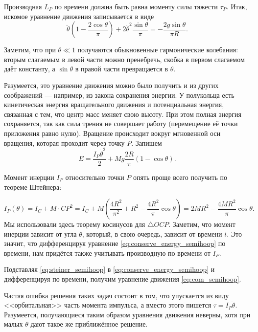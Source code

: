 \documentclass[a4paper,12pt]{article}
\begin{document}
Производная $L_P$ по времени должна быть равна моменту силы тяжести
$\tau_{P}$. Итак, искомое уравнение движения записывается в виде
\begin{equation}
  \label{eq:eom_semihoop}
  \ddot{\theta} \left( 1- \frac{2 \cos \theta}{\pi} \right) + 2
  \dot{\theta}^2 \frac{\sin \theta}{\pi} = - \frac{2g \sin \theta}{\pi
  R}. 
\end{equation}

Заметим, что при $\theta \ll 1$ получаются обыкновенные гармонические
колебания: вторым слагаемым в левой части можно пренебречь, скобка в
первом слагаемом даёт константу, а $\sin \theta$ в правой части
превращается в $\theta$. 

Разумеется, это уравнение движения можно было получить и из других
соображений --- например, из закона сохранения энергии. У полукольца
есть кинетическая энергия вращательного движения и потенциальная
энергия, связанная с тем, что центр масс меняет свою высоту. При этом
полная энергия сохраняется, так как сила трения не совершает работу
(перемещение её точки приложения равно нулю). Вращение происходит
вокруг мгновенной оси вращения, которая проходит через точку $P$.
Запишем
\begin{equation}
  \label{eq:conserve_energy_semihoop}
  E = \frac{I_P \dot{\theta}^2}{2} + Mg \frac{2R}{\pi} \left(
    1- \cos \theta \right). 
\end{equation}

Момент инерции $I_P$ относительно точки $P$ опять проще всего получить по
теореме Штейнера:

\begin{equation}
  \label{eq:steiner_semihoop}
  I_P (\theta) = I_C + M \cdot CP^2 = I_C + M \left(
    \frac{4R^2}{\pi^2} + R^2 - \frac{4R^2}{\pi} \cos \theta \right) =
  2 MR^2 - \frac{4MR^2}{\pi} \cos \theta.
\end{equation}
Мы использовали здесь теорему косинусов для $\triangle OCP$. Заметим,
что момент инерции зависит от угла $\theta$, который, в свою очередь,
зависит от времени $t$. Это значит, что дифференцируя уравнение
\eqref{eq:conserve_energy_semihoop} по времени, нам придётся также
учитывать производную по времени от $I_P$.

Подставляя \eqref{eq:steiner_semihoop} в
\eqref{eq:conserve_energy_semihoop} и дифференцируя по времени,
получим уравнение движения \eqref{eq:eom_semihoop}. 

Частая ошибка решения таких задач состоит в том, что упускается из
виду <<орбитальная>> часть момента импульса, а вместо этого пишется
$\tau = I_P \ddot{\theta}$. Разумеется, получающиеся таким образом уравнения
движения неверны, хотя при малых $\theta$ дают такое же приближённое
решение. 
\end{document}
